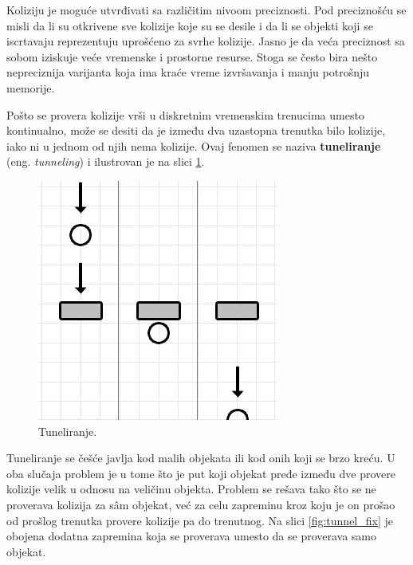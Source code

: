 \documentclass[12pt,oneside]{memoir}
\begin{document}
Koliziju je moguće utvrđivati sa različitim nivoom preciznosti. 
Pod preciznošću se misli da li su otkrivene sve kolizije koje su se desile i 
da li se objekti koji se iscrtavaju reprezentuju uprošćeno za svrhe kolizije. 
Jasno je da veća preciznost sa sobom iziskuje veće vremenske i prostorne resurse. 
Stoga se često bira nešto nepreciznija varijanta koja ima kraće vreme izvršavanja i manju potrošnju memorije.

Pošto se provera kolizije vrši u diskretnim vremenskim trenucima umesto kontinualno, može se desiti da 
je između dva uzastopna trenutka bilo kolizije, iako ni u jednom od njih nema kolizije. 
Ovaj fenomen se naziva \textbf{tuneliranje} (eng. {\em tunneling}) i ilustrovan je na slici \ref{fig:tunnel}. 

\begin{figure}[h!]
	\begin{center}
	\includegraphics[scale=0.55]{tunnel.png}
	\end{center}
	\caption{Tuneliranje.}
	\label{fig:tunnel}
\end{figure}

Tuneliranje se češće javlja kod malih objekata ili kod onih koji se brzo kreću.
U oba slučaja problem je u tome što je put koji objekat pređe između dve provere kolizije velik u odnosu na veličinu objekta. 
Problem se rešava tako što se ne proverava kolizija za sâm objekat, već za celu zapreminu kroz koju je on prošao 
od prošlog trenutka provere kolizije pa do trenutnog. Na slici \ref{fig:tunnel_fix} je obojena dodatna zapremina 
koja se proverava umesto da se proverava samo objekat. 
\end{document}
